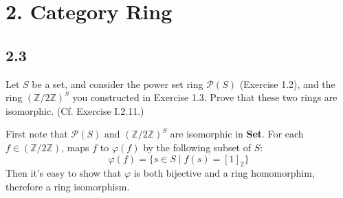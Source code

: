 \documentclass[a4paper, pdf, 12pt]{article}
\makeatletter
\renewenvironment{proof}[1][\proofname]{\par
  \pushQED{\qed}%
  \normalfont \topsep6\p@\@plus6\p@\relax
  \trivlist
  \item[%
    \hskip\labelsep
    \normalfont\bfseries %
    #1%
    \@addpunct{.}%
  ]\ignorespaces
}{%
  \popQED\endtrivlist\@endpefalse
}
\let\qed\relax %
\DeclareRobustCommand{\qed}{%
  \ifmmode \mathqed
  \else
    \leavevmode\unskip\penalty\@M\hbox{}\nobreak\hspace{.5em minus .1em}%
    \hbox{\qedsymbol}%
  \fi
}
\makeatother
\begin{document}
\section*{2. Category \textbf{Ring}}
\subsection*{2.3}
Let $S$ be a set, and consider the power set ring $\mathscr{P}(S)$ (Exercise 1.2), and the ring 
$(\mathbb{Z}/2\mathbb{Z})^{S}$ you constructed in Exercise 1.3. Prove that these two rings are isomorphic. 
(Cf. Exercise I.2.11.)
\begin{proof}
  First note that $\mathscr{P}(S)$ and $(\mathbb{Z}/2\mathbb{Z})^{S}$ are isomorphic in 
  \textbf{Set}. For each $f\in (\mathbb{Z}/2\mathbb{Z})$, maps $f$ to $\varphi(f)$ by the 
  following subset of $S$:
  $$
  \varphi(f) = \{s\in S\mid f(s) = [1]_{2}\}
  $$
  Then it's easy to show that $\varphi$ is both bijective and a ring homomorphim, therefore a ring isomorphism.
\end{proof}
\end{document}

